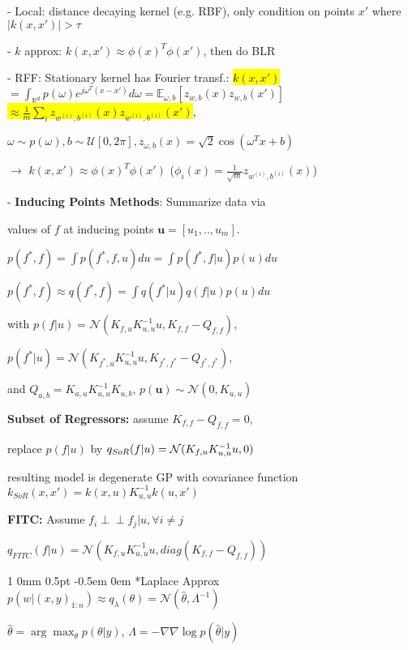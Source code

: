 \documentclass[11pt,landscape,a4paper,fleqn]{article}
\makeatletter
\newcommand*{\rsection}{%
	\@startsection{section}%
	{1}%
	{0mm}%
	{0.5pt}%
	{-0.5em \@plus 0em}
	{\color{myorange}\sffamily\small\bfseries}}
\newcommand{\mhl}[1]{\setlength{\fboxsep}{0pt}\colorbox{yellow}{#1}}
\newcommand{\indep}{\perp\!\!\!\perp}
\makeatother
\begin{document}
\begin{multicols*}{4}
- Local: distance decaying kernel (e.g. RBF), only condition on points $x'$ where $|k(x,x')| > \tau$

- $k$ approx: $k(x,x') \approx \phi(x)^T \phi(x')$, then do BLR

- RFF: Stationary kernel has Fourier transf.:  \mhl{$k(x,x')$} $= \int_{\mathbb{R}^d} p(\omega) e^{j \omega^T (x - x')} d\omega = \mathbb{E}_{\omega, b}[z_{w,b}(x) z_{w,b}(x')]$ \mhl{$\approx \frac{1}{m} \sum_i z_{w^{(i)},b^{(i)}}(x) z_{w^{(i)},b^{(i)}}(x')$},

$\omega \sim p(\omega), b \sim \mathcal{U}[0, 2\pi], z_{\omega, b}(x) = \sqrt{2} \cos(\omega^T x + b)$



$\rightarrow$ $k(x,x') \approx \phi(x)^T \phi(x')$ ($\phi_i(x) = \frac{1}{\sqrt{m}} z_{w^{(i)},b^{(i)}}(x)$)

- {\fontsize{9.5}{6}\selectfont \textbf{Inducing Points Methods}}: Summarize data via

values of $f$ at inducing points $\mathbf{u} = [u_1,..,u_m]$.

$p(f^*, f) = \int p(f^*, f, u) du = \int p(f^*, f | u) p(u) du$

$p(f^*, f) \approx q(f^*, f) = \int q(f^* | u) q(f | u) p(u) du$

with $p(f | u) = \mathcal{N}(K_{f,u} K_{u,u}^{-1} u, K_{f,f} - Q_{f,f} )$,

$p(f^* | u) = \mathcal{N}(K_{f^*,u} K_{u,u}^{-1} u, K_{f^*, f^*} - Q_{f^*, f^*})$,

and $Q_{a,b} = K_{a,u} K_{u,u}^{-1} K_{u,b}$, $p(\mathbf{u}) \sim \mathcal{N}(0, K_{u,u})$

\textbf{Subset of Regressors:} assume $K_{f,f} - Q_{f,f} = 0$,

replace $p(f|u)$ by $q_{\tiny SoR}(f|u) = \mathcal{N}(K_{f,u} K_{u,u}^{-1} u,0)$

resulting model is degenerate GP with covariance function $k_{SoR}(x,x') = k(x,u) K_{u,u}^{-1} k(u, x')$

\textbf{FITC:} Assume $f_i \indep f_j | u, \forall i \neq j$

\vspace*{-1mm}
$q_{FITC}(f | u) = \mathcal{N}(K_{f,u} K_{u,u}^{-1} u, diag(K_{f,f} - Q_{f,f}))$

\rsection*{Laplace Approx} \mbox{\fontsize{9.5}{6}\selectfont $p(w|(x,y)_{1:n}) \approx q_\lambda(\theta) = \mathcal{N}(\hat{\theta}, \Lambda^{-1})$}

$\hat{\theta} = \arg\max_\theta p(\theta | y)$, $\Lambda = - \nabla\nabla \log p(\hat{\theta} | y)$


\end{multicols*}
\end{document}
